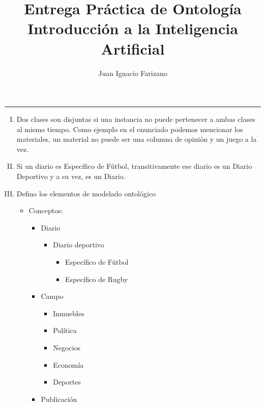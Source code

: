 \documentclass[11pt]{article}
\title{
    Entrega Práctica de Ontología \\
    \large Introducción a la Inteligencia Artificial}
\author{Juan Ignacio Farizano}
\date{}
\begin{document}
\maketitle
\noindent\rule{\textwidth}{1pt}

\begin{enumerate}[I. ]
  \item Dos clases son disjuntas si una instancia no puede pertenecer a ambas
        clases al mismo tiempo. Como ejemplo en el enunciado podemos mencionar
        los materiales, un material no puede ser una columna de opinión y un
        juego a la vez.
  \item Si un diario es Específico de Fútbol, transitivamente ese diario es un
        Diario Deportivo y a su vez, es un Diario.
  \item Defino los elementos de modelado ontológico
      \begin{itemize}
            \item Conceptos:
                  \begin{itemize}
                        \item Diario
                              \begin{itemize}
                                    \item Diario deportivo
                                    \begin{itemize}
                                          \item Específico de Fútbol
                                          \item Específico de Rugby
                                    \end{itemize}
                              \end{itemize}
                        \item Campo
                              \begin{itemize}
                                    \item Inmuebles
                                    \item Política
                                    \item Negocios
                                    \item Economía
                                    \item Deportes
                              \end{itemize}
                        \item Publicación

\end{itemize}
\end{itemize}
\end{enumerate}
\end{document}

